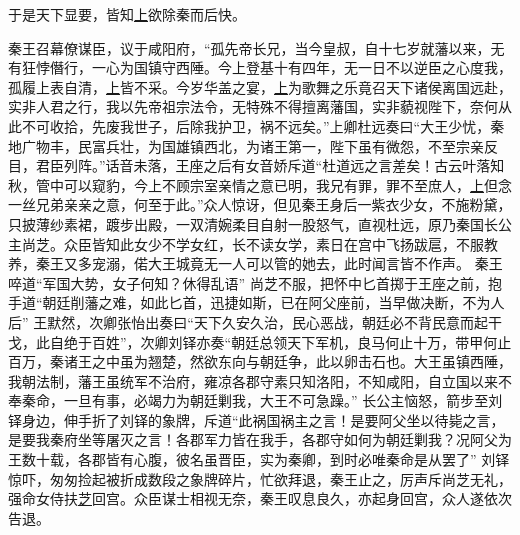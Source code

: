 \documentclass[UTF8]{ctexart}
\begin{document}
于是天下显要，皆知\uline{上}欲除秦而后快。

秦王召幕僚谋臣，议于咸阳府，“孤先帝长兄，当今皇叔，自十七岁就藩以来，无有狂悖僭行，一心为国镇守西陲。今上登基十有四年，无一日不以逆臣之心度我，孤履上表自清，\uline{上}皆不采。今岁华盖之宴，\uline{上}为歌舞之乐竟召天下诸侯离国远赴，实非人君之行，我以先帝祖宗法令，无特殊不得擅离藩国，实非藐视陛下，奈何从此不可收拾，先废我世子，后除我护卫，祸不远矣。”上卿杜远奏曰“大王少忧，秦地广物丰，民富兵壮，为国雄镇西北，为诸王第一，陛下虽有微怨，不至宗亲反目，君臣列阵。”话音未落，王座之后有女音娇斥道“杜道远之言差矣！古云叶落知秋，管中可以窥豹，今上不顾宗室亲情之意已明，我兄有罪，罪不至庶人，\uline{上}但念一丝兄弟亲亲之意，何至于此。”众人惊讶，但见秦王身后一紫衣少女，不施粉黛，只披薄纱素裙，踱步出殿，一双清婉柔目自射一股怒气，直视杜远，原乃秦国长公主尚芝。众臣皆知此女少不学女红，长不读女学，素日在宫中飞扬跋扈，不服教养，秦王又多宠溺，偌大王城竟无一人可以管的她去，此时闻言皆不作声。 秦王啐道“军国大势，女子何知？休得乱语” 尚芝不服，把怀中匕首掷于王座之前，抱手道“朝廷削藩之难，如此匕首，迅捷如斯，已在阿父座前，当早做决断，不为人后” 王默然，次卿张怡出奏曰“天下久安久治，民心恶战，朝廷必不背民意而起干戈，此自绝于百姓”，次卿刘铎亦奏“朝廷总领天下军机，良马何止十万，带甲何止百万，秦诸王之中虽为翘楚，然欲东向与朝廷争，此以卵击石也。大王虽镇西陲，我朝法制，藩王虽统军不治府，雍凉各郡守素只知洛阳，不知咸阳，自立国以来不奉秦命，一旦有事，必竭力为朝廷剿我，大王不可急躁。” 长公主恼怒，箭步至刘铎身边，伸手折了刘铎的象牌，斥道“此祸国祸主之言！是要阿父坐以待毙之言，是要我秦府坐等屠灭之言！各郡军力皆在我手，各郡守如何为朝廷剿我？况阿父为王数十载，各郡皆有心腹，彼名虽晋臣，实为秦卿，到时必唯秦命是从罢了” 刘铎惊吓，匆匆捡起被折成数段之象牌碎片，忙欲拜退，秦王止之，厉声斥尚芝无礼，强命女侍扶\uline{芝}回宫。众臣谋士相视无奈，秦王叹息良久，亦起身回宫，众人遂依次告退。
\end{document}
